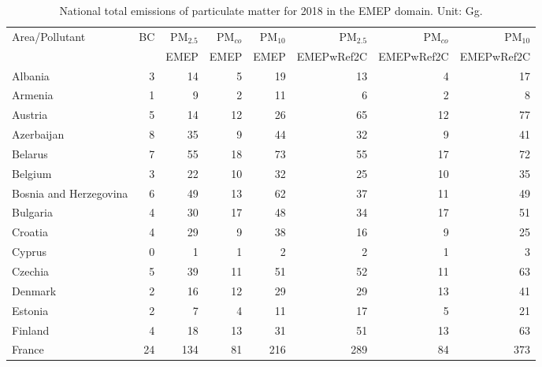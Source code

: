 \begin{table}
\caption{National total emissions of particulate matter for 2018 in the EMEP
  domain. Unit: Gg. }
\label{tab:2018emisPM}

\vspace{15pt}

\begin{center}
\scriptsize
\begin{tabular}{|l|r|r|r|r||r|r|r|}
\hline
 Area/Pollutant& BC&PM$_{2.5}$&PM$_{co}$&PM$_{10}$&PM$_{2.5}$&PM$_{co}$&PM$_{10}$\\
 &&EMEP&EMEP&EMEP&EMEPwRef2C&EMEPwRef2C&EMEPwRef2C\\\hline\hline
                       Albania&     3&    14&     5&    19&    13&     4&    17 \\\hline
                       Armenia&     1&     9&     2&    11&     6&     2&     8 \\\hline
                       Austria&     5&    14&    12&    26&    65&    12&    77 \\\hline
                    Azerbaijan&     8&    35&     9&    44&    32&     9&    41 \\\hline
                       Belarus&     7&    55&    18&    73&    55&    17&    72 \\\hline
                       Belgium&     3&    22&    10&    32&    25&    10&    35 \\\hline
        Bosnia and Herzegovina&     6&    49&    13&    62&    37&    11&    49 \\\hline
                      Bulgaria&     4&    30&    17&    48&    34&    17&    51 \\\hline
                       Croatia&     4&    29&     9&    38&    16&     9&    25 \\\hline
                        Cyprus&     0&     1&     1&     2&     2&     1&     3 \\\hline
                       Czechia&     5&    39&    11&    51&    52&    11&    63 \\\hline
                       Denmark&     2&    16&    12&    29&    29&    13&    41 \\\hline
                       Estonia&     2&     7&     4&    11&    17&     5&    21 \\\hline
                       Finland&     4&    18&    13&    31&    51&    13&    63 \\\hline
                        France&    24&   134&    81&   216&   289&    84&   373 \\\hline

\end{tabular}
\end{center}
\end{table}
